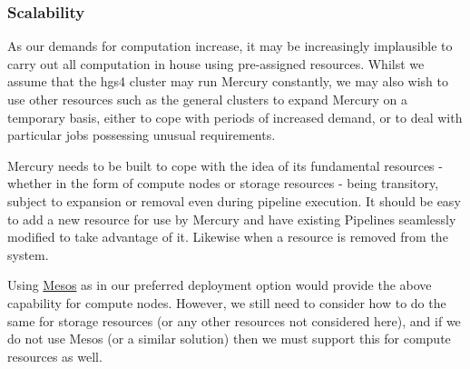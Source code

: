 \documentclass[10pt,a4paper]{article}
\newcommand{\npar}{\par\noindent\space}
\begin{document}
\subsubsection{Scalability}
\npar As our demands for computation increase, it may be increasingly implausible to carry out all computation in house using pre-assigned resources. Whilst we assume that the hgs4 cluster may run Mercury constantly, we may also wish to use other resources such as the general clusters to expand Mercury on a temporary basis, either to cope with periods of increased demand, or to deal with particular jobs possessing unusual requirements.
\npar Mercury needs to be built to cope with the idea of its fundamental resources - whether in the form of compute nodes or storage resources - being transitory, subject to expansion or removal even during pipeline execution. It should be easy to add a new resource for use by Mercury and have existing Pipelines seamlessly modified to take advantage of it. Likewise when a resource is removed from the system.
\npar Using \href{http://mesos.apache.org/}{Mesos} as in our preferred deployment option would provide the above capability for compute nodes. However, we still need to consider how to do the same for storage resources (or any other resources not considered here), and if we do not use Mesos (or a similar solution) then we must support this for compute resources as well.
\end{document}
